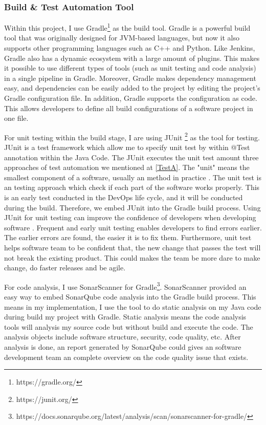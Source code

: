 \subsubsection{Build \& Test Automation Tool}
Within this project, I use Gradle\footnote{https://gradle.org/} as the build tool.
Gradle is a powerful build tool that was originally designed for JVM-based languages, but now it also supports other programming languages such as C++ and Python.
Like Jenkins, Gradle also has a dynamic ecosystem with a large amount of plugins. This makes it possible to use different types of tools (such as unit testing and code analysis) in a single pipeline in Gradle. 
Moreover, Gradle makes dependency management easy, and dependencies can be easily added to the project by editing the project's Gradle configuration file. In addition, Gradle supports the configuration as code. This allows developers to define all build configurations of a software project in one file.
\par
For unit testing within the build stage, I are using JUnit \footnote{https://junit.org/} as the tool for testing. JUnit is a test framework which allow me to specify unit test by within @Test annotation within the Java Code. The JUnit executes the unit test amount three approaches of test automation we mentioned at \ref{TestA}. The "unit" means the smallest component of a software, usually an method in practice \cite{UnitTest65:online}. The unit test is an testing approach which check if each part of the software works properly. 
This is an early test conducted in the DevOps life cycle, and it will be conducted during the build. Therefore, we embed JUnit into the Gradle build process. Using JUnit for unit testing can improve the confidence of developers when developing software \cite{UnitTest65:online}. Frequent and early unit testing enables developers to find errors earlier. The earlier errors are found, the easier it is to fix them. Furthermore, unit test helps software team to be confident that, the new change that passes the test will not break the existing product. This could makes the team be more dare to make change, do faster releases and be agile.
\par
For code analysis, I use SonarScanner for Gradle\footnote{https://docs.sonarqube.org/latest/analysis/scan/sonarscanner-for-gradle/}. SonarScanner provided an easy way to embed SonarQube code analysis into the Gradle build process. This means in my implementation, I use the tool to do static analysis on my Java code during build my project with Gradle. Static analysis means the code analysis tools will analysis my source code but without build and execute the code. The analysis objects include software structure, security, code quality, etc. After analysis is done, an report generated by SonarQube could gives an software development team an complete overview on the code quality issue that exists. 
